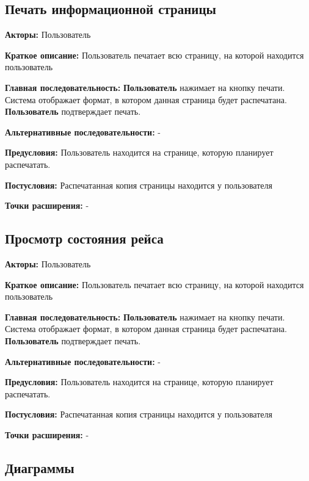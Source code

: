 \subsection{Печать информационной страницы}

\textbf{Акторы:} Пользователь

\textbf{Краткое описание:} Пользователь печатает всю страницу, на которой находится пользователь

\textbf{Главная последовательность:} \textbf{Пользователь} нажимает на кнопку печати. Система отображает формат, в котором данная страница
будет распечатана. \textbf{Пользователь} подтверждает печать.

\textbf{Альтернативные последовательности:} -

\textbf{Предусловия:} Пользователь находится на странице, которую планирует распечатать.

\textbf{Постусловия:} Распечатанная копия страницы находится у пользователя

\textbf{Точки расширения:} -




\subsection{Просмотр состояния рейса}

\textbf{Акторы:} Пользователь

\textbf{Краткое описание:} Пользователь печатает всю страницу, на которой находится пользователь

\textbf{Главная последовательность:} \textbf{Пользователь} нажимает на кнопку печати. Система отображает формат, в котором данная страница
будет распечатана. \textbf{Пользователь} подтверждает печать.

\textbf{Альтернативные последовательности:} -

\textbf{Предусловия:} Пользователь находится на странице, которую планирует распечатать.

\textbf{Постусловия:} Распечатанная копия страницы находится у пользователя

\textbf{Точки расширения:} -

\newpage

\subsection{Диаграммы}

